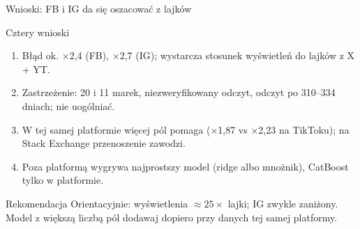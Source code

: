 \documentclass[aspectratio=169,10pt]{beamer}
\renewcommand{\x}[1]{$\times$#1}
\begin{document}
\begin{frame}{Wnioski: FB i IG da się oszacować z lajków}
\begin{block}{Cztery wnioski}
\normalsize
\begin{enumerate}\setlength\itemsep{3pt}
\item Błąd ok. \x{2,4} (FB), \x{2,7} (IG); wystarcza stosunek wyświetleń do lajków z X + YT.
\item Zastrzeżenie: 20 i 11 marek, niezweryfikowany odczyt, odczyt po 310--334 dniach; nie uogólniać.
\item W tej samej platformie więcej pól pomaga (\x{1,87} vs \x{2,23} na TikToku); na Stack Exchange przenoszenie zawodzi.
\item Poza platformą wygrywa najprostszy model (ridge albo mnożnik), CatBoost tylko w platformie.
\end{enumerate}
\end{block}
\begin{alertblock}{Rekomendacja}
\normalsize Orientacyjnie: wyświetlenia $\approx 25\times$ lajki; IG zwykle zaniżony. Model z większą liczbą pól dodawaj dopiero przy danych tej samej platformy.
\end{alertblock}
\end{frame}
\end{document}
